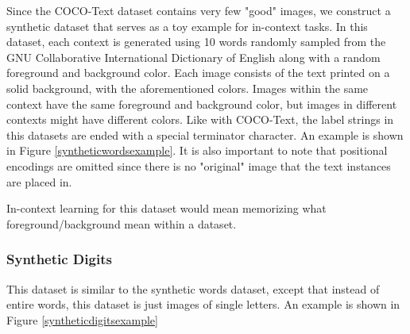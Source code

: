 Since the COCO-Text dataset contains very few "good" images, we construct a
synthetic dataset that serves as a toy example for in-context tasks.
In this dataset, each context is generated using 10 words randomly sampled from
the GNU Collaborative International Dictionary of English\cite{gcide} along with
a random foreground and background color.
Each image consists of the text printed on a solid background, with the
aforementioned colors.
Images within the same context have the same foreground and background color,
but images in different contexts might have different colors.
Like with COCO-Text, the label strings in this datasets are ended with a special
terminator character.
An example is shown in Figure \ref{syntheticwordsexample}.
It is also important to note that positional encodings are omitted since there
is no "original" image that the text instances are placed in.

In-context learning for this dataset would mean memorizing what
foreground/background mean within a dataset.

\subsubsection{Synthetic Digits}
This dataset is similar to the synthetic words dataset, except that instead of
entire words, this dataset is just images of single letters.
An example is shown in Figure \ref{syntheticdigitsexample}

